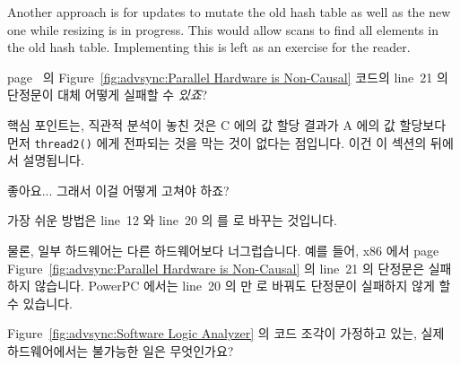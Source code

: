 \begin{enumerate}
	Another approach is for updates to mutate the old hash
	table as well as the new one while resizing is in
	progress.
	This would allow scans to find all elements in the old
	hash table.
	Implementing this is left as an exercise for the reader.

\QuickQ{}
	page~\pageref{fig:advsync:Parallel Hardware is Non-Causal} 의
	Figure~\ref{fig:advsync:Parallel Hardware is Non-Causal} 코드의 line~21
	의 단정문이 대체 어떻게 실패할 수 \emph{있죠}?

\QuickA{}
	핵심 포인트는, 직관적 분석이 놓친 것은 C 에의 값 할당 결과가 A 에의 값
	할당보다 먼저 {\tt thread2()} 에게 전파되는 것을 막는 것이 없다는
	점입니다.
	이건 이 섹션의 뒤에서 설명됩니다.

\QuickQ{}
	좋아요... 그래서 이걸 어떻게 고쳐야 하죠?

\QuickA{}
	가장 쉬운 방법은 line~12 와 line~20 의  를 
	로 바꾸는 것입니다.

	물론, 일부 하드웨어는 다른 하드웨어보다 너그럽습니다.
	예를 들어, x86 에서
	page~\pageref{fig:advsync:Parallel Hardware is Non-Causal}
	Figure~\ref{fig:advsync:Parallel Hardware is Non-Causal} 의 line~21 의
	단정문은 실패하지 않습니다.
	PowerPC 에서는 line~20 의  만  로 바꿔도
	단정문이 실패하지 않게 할 수 있습니다.

\QuickQ{}
	Figure~\ref{fig:advsync:Software Logic Analyzer} 의 코드 조각이
	가정하고 있는, 실제 하드웨어에서는 불가능한 일은 무엇인가요?
	\iffalse


\end{enumerate}
